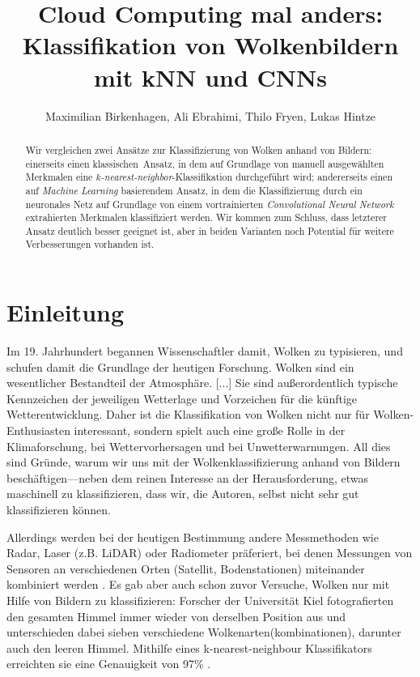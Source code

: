 \documentclass[a4,german]{article}
\begin{document}
\title{Cloud Computing mal anders: Klassifikation von Wolkenbildern mit kNN und CNNs}
\author{Maximilian Birkenhagen, Ali Ebrahimi, Thilo Fryen, Lukas Hintze}
\maketitle

\begin{abstract}
    Wir vergleichen zwei Ansätze zur Klassifizierung von Wolken anhand von Bildern:
        einerseits einen \glqq klassischen\grqq\ Ansatz, in dem auf Grundlage von manuell ausgewählten Merkmalen eine \emph{$k$-nearest-neighbor}-Klassifika\-tion durchgeführt wird;
        andererseits einen auf \emph{Machine Learning} basierendem Ansatz, in dem die Klassifizierung durch ein neuronales Netz auf Grundlage von einem vortrainierten \emph{Convolutional Neural Network} extrahierten Merkmalen klassifiziert werden.
    Wir kommen zum Schluss, dass letzterer Ansatz deutlich besser geeignet ist, aber in beiden Varianten noch Potential für weitere Verbesserungen vorhanden ist.
\end{abstract}

\section{Einleitung}

Im 19. Jahrhundert begannen Wissenschaftler damit, Wolken zu typisieren, und schufen damit die Grundlage der heutigen Forschung. %
\glqq Wolken sind ein wesentlicher Bestandteil der Atmosphäre. [...] Sie sind außerordentlich typische Kennzeichen der jeweiligen Wetterlage und Vorzeichen für die künftige Wetterentwicklung.\grqq\cite{wolkenatlas:Karlsruhe}
Daher ist die Klassifikation von Wolken nicht nur für Wolken-Enthusiasten interessant, sondern spielt auch eine große Rolle in der Klimaforschung, bei Wettervorhersagen und bei Unwetterwarnungen.
All dies sind Gründe, warum wir uns mit der Wolkenklassifizierung anhand von Bildern beschäftigen---neben dem reinen Interesse an der Herausforderung, etwas maschinell zu klassifizieren, dass wir, die Autoren, selbst nicht sehr gut klassifizieren können.

Allerdings werden bei der heutigen Bestimmung andere Messmethoden wie Radar, Laser (z.B. LiDAR) oder Radiometer präferiert, bei denen Messungen von Sensoren an verschiedenen Orten (Satellit, Bodenstationen) miteinander kombiniert werden \cite{wang}.
Es gab aber auch schon zuvor Versuche, Wolken nur mit Hilfe von Bildern zu klassifizieren:
Forscher der Universität Kiel fotografierten den gesamten Himmel immer wieder von derselben Position aus und unterschieden dabei sieben verschiedene Wolkenarten(kombinationen), darunter auch den \glqq leeren Himmel\grqq.
Mithilfe eines k-nearest-neighbour Klassifikators erreichten sie eine Genauigkeit von 97\% \cite{heinle}.
\end{document}

